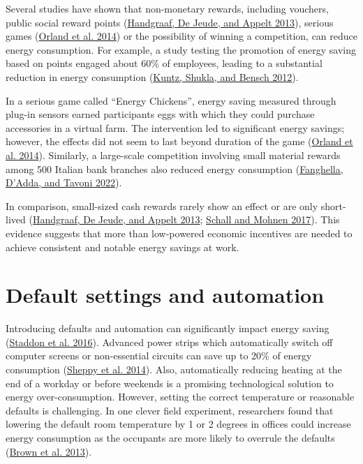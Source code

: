 \documentclass[
  11pt,
  captions=heading]{scrreport}
\begin{document}
Several studies have shown that non-monetary rewards, including
vouchers, public social reward points
(\protect\hyperlink{ref-handgraaf2013public}{Handgraaf, De Jeude, and
Appelt 2013}), serious games
(\protect\hyperlink{ref-orland2014saving}{Orland et al. 2014}) or the
possibility of winning a competition, can reduce energy consumption. For
example, a study testing the promotion of energy saving based on points
engaged about 60\% of employees, leading to a substantial reduction in
energy consumption (\protect\hyperlink{ref-kuntz2012many}{Kuntz, Shukla,
and Bensch 2012}).

In a serious game called ``Energy Chickens'', energy saving measured
through plug-in sensors earned participants eggs with which they could
purchase accessories in a virtual farm. The intervention led to
significant energy savings; however, the effects did not seem to last
beyond duration of the game
(\protect\hyperlink{ref-orland2014saving}{Orland et al. 2014}).
Similarly, a large-scale competition involving small material rewards
among 500 Italian bank branches also reduced energy consumption
(\protect\hyperlink{ref-fanghella2022evaluating}{Fanghella, D'Adda, and
Tavoni 2022}).

In comparison, small-sized cash rewards rarely show an effect or are
only short-lived (\protect\hyperlink{ref-handgraaf2013public}{Handgraaf,
De Jeude, and Appelt 2013};
\protect\hyperlink{ref-schall2017incentivizing}{Schall and Mohnen
2017}). This evidence suggests that more than low-powered economic
incentives are needed to achieve consistent and notable energy savings
at work.

\hypertarget{default-settings-and-automation}{%
\section{Default settings and
automation}\label{default-settings-and-automation}}

Introducing defaults and automation can significantly impact energy
saving (\protect\hyperlink{ref-staddon2016intervening}{Staddon et al.
2016}). Advanced power strips which automatically switch off computer
screens or non-essential circuits can save up to 20\% of energy
consumption (\protect\hyperlink{ref-sheppy2014reducing}{Sheppy et al.
2014}). Also, automatically reducing heating at the end of a workday or
before weekends is a promising technological solution to energy
over-consumption. However, setting the correct temperature or reasonable
defaults is challenging. In one clever field experiment, researchers
found that lowering the default room temperature by 1 or 2 degrees in
offices could increase energy consumption as the occupants are more
likely to overrule the defaults
(\protect\hyperlink{ref-brown2013testing}{Brown et al. 2013}).
\end{document}
